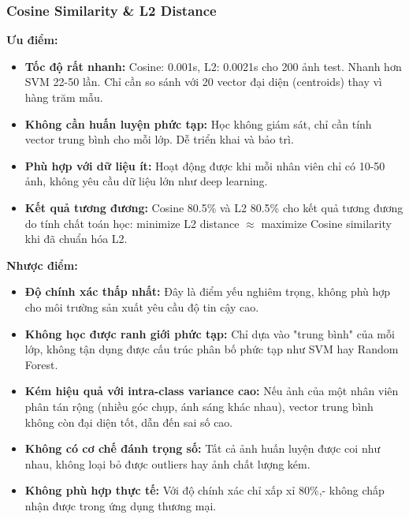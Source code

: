 \documentclass[a4paper]{book}
\begin{document}
\subsubsection{Cosine Similarity \& L2 Distance}

\textbf{Ưu điểm:}
\begin{itemize}
    \item \textbf{Tốc độ rất nhanh:} Cosine: 0.001s, L2: 0.0021s cho 200 ảnh test. Nhanh hơn SVM 22-50 lần. Chỉ cần so sánh với 20 vector đại diện (centroids) thay vì hàng trăm mẫu.
    
    \item \textbf{Không cần huấn luyện phức tạp:} Học không giám sát, chỉ cần tính vector trung bình cho mỗi lớp. Dễ triển khai và bảo trì.
    
    \item \textbf{Phù hợp với dữ liệu ít:} Hoạt động được khi mỗi nhân viên chỉ có 10-50 ảnh, không yêu cầu dữ liệu lớn như deep learning.
    
    \item \textbf{Kết quả tương đương:} Cosine 80.5\% và L2 80.5\% cho kết quả tương đương do tính chất toán học: minimize L2 distance $\approx$ maximize Cosine similarity khi đã chuẩn hóa L2.
    
\end{itemize}

\textbf{Nhược điểm:}
\begin{itemize}
    \item \textbf{Độ chính xác thấp nhất:} Đây là điểm yếu nghiêm trọng, không phù hợp cho môi trường sản xuất yêu cầu độ tin cậy cao.
    
    \item \textbf{Không học được ranh giới phức tạp:} Chỉ dựa vào "trung bình" của mỗi lớp, không tận dụng được cấu trúc phân bố phức tạp như SVM hay Random Forest.
    
    \item \textbf{Kém hiệu quả với intra-class variance cao:} Nếu ảnh của một nhân viên phân tán rộng (nhiều góc chụp, ánh sáng khác nhau), vector trung bình không còn đại diện tốt, dẫn đến sai số cao.
    
    \item \textbf{Không có cơ chế đánh trọng số:} Tất cả ảnh huấn luyện được coi như nhau, không loại bỏ được outliers hay ảnh chất lượng kém.
    
    \item \textbf{Không phù hợp thực tế:} Với độ chính xác chỉ xấp xỉ 80\%,- không chấp nhận được trong ứng dụng thương mại.
\end{itemize}
\end{document}
